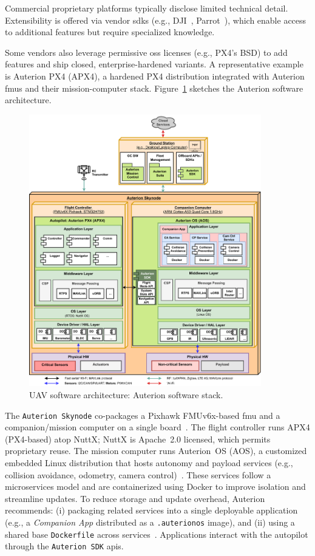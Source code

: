 Commercial proprietary platforms typically disclose limited technical detail. 
Extensibility is offered via vendor \glspl{sdk} (e.g., DJI~\cite{djiSDK}, Parrot~\cite{parrot-sdk}), 
which enable access to additional features but require specialized knowledge.

Some vendors also leverage permissive \gls{oss} licenses (e.g., PX4’s BSD) to
add features and ship closed, enterprise-hardened variants.
A representative example is Auterion PX4 (APX4), a hardened PX4 distribution integrated with Auterion \glspl{fmu} and their mission-computer stack. 
Figure~\ref{fig:uav-sw-arch-auterion} sketches the Auterion software architecture.

\begin{figure}[!hbt]
  \centering
  \includegraphics[width=0.9\textwidth]{./img/pdf/uav-main-sw-arch-auterion.pdf}
  \caption{UAV software architecture: Auterion software stack.}
  \label{fig:uav-sw-arch-auterion}
\end{figure}

The \lstinline|Auterion Skynode| co-packages a Pixhawk FMUv6x-based \gls{fmu} and a companion/mission computer on a single board~\cite{auterion-sw}. 
The flight controller runs APX4 (PX4-based) atop NuttX; NuttX is Apache~2.0
licensed, which permits proprietary reuse.
The mission computer runs Auterion~OS (AOS), a customized embedded Linux
distribution that hosts autonomy and payload services (e.g., collision
avoidance, odometry, camera control)~\cite{auterion-sw}.
These services follow a microservices model and are containerized using Docker to improve isolation and streamline updates. 
To reduce storage and update overhead, Auterion recommends: 
(i) packaging related services into a single deployable application (e.g., a \emph{Companion App} distributed as a \lstinline|.auterionos| image), and 
(ii) using a shared base \lstinline|Dockerfile| across services~\cite{auterion-sw-services}. 
Applications interact with the autopilot through the \lstinline|Auterion SDK| \glspl{api}.

